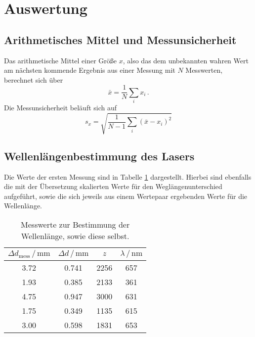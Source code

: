 \section{Auswertung}
\label{sec:Auswertung}

\subsection{Arithmetisches Mittel und Messunsicherheit}

Das arithmetische Mittel einer Größe $x$, also das dem unbekannten wahren Wert am nächsten kommende Ergebnis aus einer Messung mit $N$ Messwerten, berechnet sich über 
\begin{equation}
    \bar{x}=\frac{1}{N} \sum_i x_i\,.
    \label{eqn:mittel}
\end{equation}
Die Messunsicherheit beläuft sich auf 
\begin{equation}
    s_x=\sqrt{\frac{1}{N-1}\sum_i (\bar{x}-x_i)^2}
    \label{eqn:falsch}
\end{equation}

\subsection{Wellenlängenbestimmung des Lasers}

Die Werte der ersten Messung sind in Tabelle \ref{tab:lambda} dargestellt. 
Hierbei sind ebenfalls die mit der Übersetzung skalierten Werte für den Weglängenunterschied aufgeführt, 
sowie die sich jeweils aus einem Wertepaar ergebenden Werte für die Wellenlänge. 

\begin{table}
    \centering
    \caption{Messwerte zur Bestimmung der Wellenlänge, sowie diese selbst.}
    \label{tab:lambda}
    \begin{tabular}{c c c c}
        \toprule
        $\Delta d_\text{mess}\,/\,\si{\milli\meter}$ & $\Delta d\,/\,\si{\milli\meter}$ & $z$ & $\lambda \,/\,\si{\nano\meter}$ \\
        \midrule
        3.72 & 0.741 & 2256 & 657 \\
        1.93 & 0.385 & 2133 & 361 \\
        4.75 & 0.947 & 3000 & 631 \\
        1.75 & 0.349 & 1135 & 615 \\
        3.00 & 0.598 & 1831 & 653 \\        
        \bottomrule
    \end{tabular}
\end{table}

